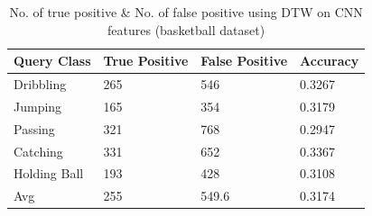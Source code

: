 \begin{table}[ht]
\caption[Event classification using DTW on CNN features (OSUPEL basketball Dataset) ]{No. of true positive \& No. of false positive using DTW on CNN features (basketball dataset)}
\label{table:cnn_dtw_res_basket}
\centering
\begin{tabular}{|l|l|l|l|}
\hline
Query Class & True Positive & False Positive & Accuracy \\ \hline
Dribbling   &265  &546   &0.3267\\
Jumping     &165  &354   &0.3179\\
Passing     &321  &768   &0.2947\\
Catching    &331  &652   &0.3367\\
Holding Ball &193  &428   &0.3108\\
\hline
Avg         &255  &549.6 &0.3174\\
\hline  
\end{tabular}
\end{table} 

